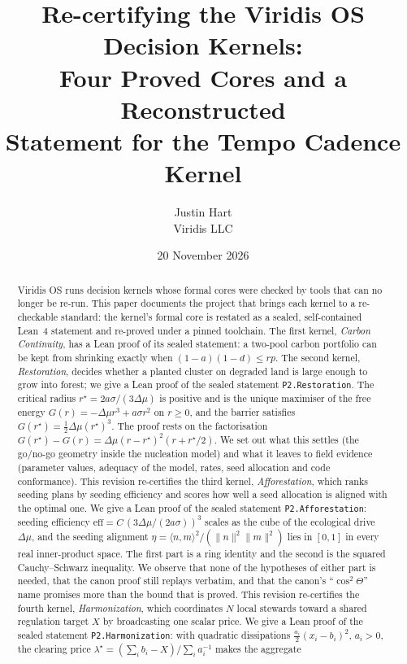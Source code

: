 \documentclass[11pt]{article}
\title{Re-certifying the Viridis OS Decision Kernels:\\ Four Proved Cores and a Reconstructed\\ Statement for the Tempo Cadence Kernel}
\author{Justin Hart\\ Viridis LLC}
\date{20 November 2026}
\theoremstyle{definition}
\theoremstyle{remark}
\begin{document}
\maketitle

\begin{abstract}
Viridis OS runs decision kernels whose formal cores were checked by tools that can no longer be re-run.
This paper documents the project that brings each kernel to a re-checkable standard: the kernel's formal core is restated as a
sealed, self-contained Lean~4 statement and re-proved under a pinned toolchain.
The first kernel, \emph{Carbon Continuity}, has a Lean proof of its sealed statement: a two-pool carbon portfolio can be kept
from shrinking exactly when $(1-a)(1-d)\le rp$.
The second kernel, \emph{Restoration}, decides whether a planted cluster on degraded
land is large enough to grow into forest; we give a Lean proof of the sealed statement \texttt{P2.Restoration}.
The critical radius $r^\star=2a\sigma/(3\Delta\mu)$ is positive and is the unique maximiser of the free energy
$G(r)=-\Delta\mu r^3+a\sigma r^2$ on $r\ge 0$, and the barrier satisfies $G(r^\star)=\tfrac12\Delta\mu (r^\star)^3$.
The proof rests on the factorisation $G(r^\star)-G(r)=\Delta\mu(r-r^\star)^2(r+r^\star/2)$.
We set out what this settles (the go/no-go geometry inside the nucleation model) and what it leaves to field
evidence (parameter values, adequacy of the model, rates, seed allocation and code conformance).
This revision re-certifies the third kernel, \emph{Afforestation}, which ranks seeding plans by seeding efficiency
and scores how well a seed allocation is aligned with the optimal one.
We give a Lean proof of the sealed statement \texttt{P2.Afforestation}: seeding efficiency
$\mathrm{eff}=C\,(3\Delta\mu/(2a\sigma))^3$ scales as the cube of the ecological drive $\Delta\mu$, and the seeding
alignment $\eta=\langle n,m\rangle^2/(\|n\|^2\|m\|^2)$ lies in $[0,1]$ in every real inner-product space.
The first part is a ring identity and the second is the squared Cauchy--Schwarz inequality.
We observe that none of the hypotheses of either part is needed, that the canon proof still replays verbatim,
and that the canon's ``$\cos^2\Theta$'' name promises more than the bound that is proved.
This revision re-certifies the fourth kernel, \emph{Harmonization}, which coordinates $N$ local stewards toward a shared
regulation target $X$ by broadcasting one scalar price.
We give a Lean proof of the sealed statement \texttt{P2.Harmonization}: with quadratic dissipations
$\tfrac{a_i}{2}(x_i-b_i)^2$, $a_i>0$, the clearing price $\lambda^\star=(\sum_i b_i-X)/\sum_i a_i^{-1}$ makes the aggregate

\end{abstract}
\end{document}
